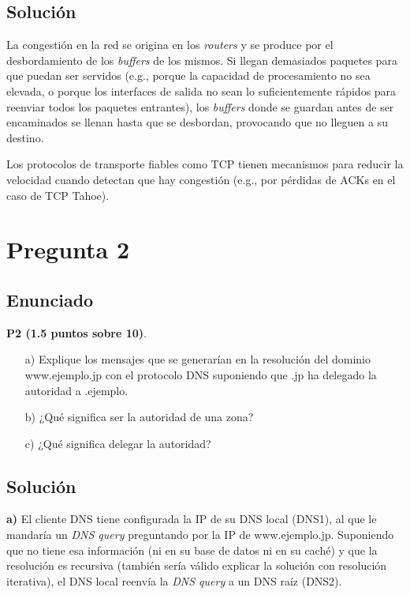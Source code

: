 \documentclass[12pt]{article}
\begin{document}
\subsection{Solución}

La congestión en la red se origina en los \textit{routers} y se produce por el desbordamiento de los \textit{buffers} de los mismos. Si llegan demasiados paquetes para que puedan ser servidos (e.g., porque la capacidad de procesamiento no sea elevada, o porque los interfaces de salida no sean lo suficientemente rápidos para reenviar todos los paquetes entrantes), los \textit{buffers} donde se guardan antes de ser encaminados se llenan hasta que se desbordan, provocando que no lleguen a su destino.

Los protocolos de transporte fiables como TCP tienen mecanismos para reducir la velocidad cuando detectan que hay congestión (e.g., por pérdidas de ACKs en el caso de TCP Tahoe).

\section{Pregunta 2}

\subsection{Enunciado}

\textbf{P2 (1.5 puntos sobre 10)}. 
\begin{itemize}
    \item[a)] Explique los mensajes que se generarían en la resolución del dominio www.ejemplo.jp con el protocolo DNS suponiendo que .jp ha delegado la autoridad a .ejemplo.
    \item[b)] ¿Qué significa ser la autoridad de una zona?
    \item[c)] ¿Qué significa delegar la autoridad?
\end{itemize}

\subsection{Solución}

\textbf{a)} El cliente DNS tiene configurada la IP de su DNS local (DNS1), al que le mandaría un \textit{DNS query} preguntando por la IP de www.ejemplo.jp. Suponiendo que no tiene esa información (ni en su base de datos ni en su caché) y que la resolución es recursiva (también sería válido explicar la solución con resolución iterativa), el DNS local reenvía la \textit{DNS query} a un DNS raíz (DNS2). 
\end{document}
